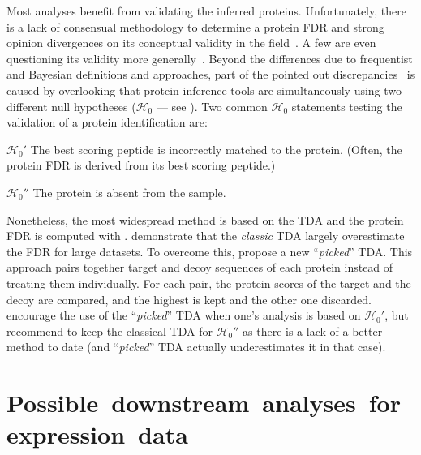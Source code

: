Most analyses benefit from validating the inferred proteins.
Unfortunately,
there is a lack of consensual methodology
to determine a protein \gls{FDR}
and strong opinion divergences on its conceptual validity
in the field~.
A few are even questioning its validity more generally~.
Beyond the differences due to frequentist and Bayesian definitions and approaches,
part of the pointed out discrepancies~ is caused by
overlooking that protein inference tools are simultaneously using
two different null hypotheses ($\mathcal{H}_0$ --- see ).
Two common $\mathcal{H}_0$ statements testing
the validation of a protein identification are:\mybr\
\begin{eqlist}
    \item[$\mathcal{H}_0'$] The best scoring peptide is incorrectly matched
        to the protein.
        (Often, the protein \gls{FDR} is derived from its best scoring peptide.)
    \item[$\mathcal{H}_0''$] The protein is absent from the sample.
\end{eqlist}

Nonetheless, the most widespread method is based on the \gls{TDA}
and the protein \gls{FDR} is computed with \Crefp{eq:fdr-prot}{~}.
\citet{Savitski2015-fx} demonstrate that the \emph{classic} \gls{TDA}
largely overestimate the \gls{FDR} for large datasets.
To overcome this,
\citet{Savitski2015-fx} propose a new \enquote{\emph{picked}} \gls{TDA}.
This approach pairs together target and decoy sequences of each protein
instead of treating them individually.
For each pair, the protein scores of the target and the decoy are compared,
and the highest is kept and the other one discarded.
\citet{The2016-ua} encourage the use of the \enquote{\emph{picked}} \gls{TDA}
when one's analysis is based on $\mathcal{H}_0'$,
but recommend to keep the classical \gls{TDA} for $\mathcal{H}_0''$
as there is a lack of a better method to date
(and \enquote{\emph{picked}} \gls{TDA} actually underestimates it in that case).\mybr\

\section{Possible~downstream~analyses~for~expression~data}\label{sec:enrichmentAnalysis}

